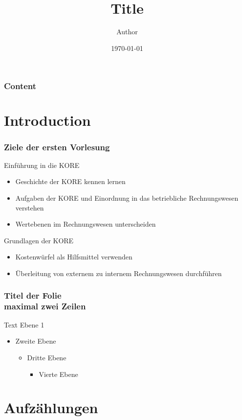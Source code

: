 \documentclass{beamer}
\title[Title]{Title\\}
\author{Author}
\date{\today}
\institute[Institute for XY]{Institute for XY\\ Working Group X Y}
\begin{document}
\titleframe

\begin{frame}
  \frametitle{Content}
  \tableofcontents%
\end{frame}


\section{Introduction}
\begin{frame}
	\frametitle{Ziele der ersten Vorlesung}
	Einführung in die KORE
	\begin{itemize}
		\item Geschichte der KORE kennen lernen
		\item Aufgaben der KORE und Einordnung in das betriebliche Rechnungswesen verstehen
		\item Wertebenen im Rechnungswesen unterscheiden
	\end{itemize}
	
	Grundlagen der KORE
	\begin{itemize}
		\item Kostenwürfel als Hilfsmittel verwenden
		\item Überleitung von externem zu internem Rechnungswesen durchführen
	\end{itemize}
\end{frame}

\begin{frame}
	\frametitle{Titel der Folie\\maximal zwei Zeilen}
	Text Ebene 1
	\begin{itemize}
		\item Zweite Ebene
		\begin{itemize}
			\item Dritte Ebene
			\begin{itemize}
				\item Vierte Ebene
			\end{itemize}
		\end{itemize}
	\end{itemize}
\end{frame}

\section{Aufzählungen}
\end{document}
